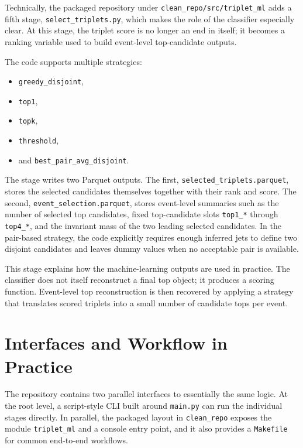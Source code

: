 \documentclass[11pt]{article}
\begin{document}
Technically, the packaged repository under \texttt{clean\_repo/src/triplet\_ml} adds a fifth stage, \texttt{select\_triplets.py}, which makes the role of the classifier especially clear. At this stage, the triplet score is no longer an end in itself; it becomes a ranking variable used to build event-level top-candidate outputs.

The code supports multiple strategies:
\begin{itemize}[leftmargin=*]
  \item \texttt{greedy\_disjoint},
  \item \texttt{top1},
  \item \texttt{topk},
  \item \texttt{threshold},
  \item and \texttt{best\_pair\_avg\_disjoint}.
\end{itemize}

The stage writes two Parquet outputs. The first, \texttt{selected\_triplets.parquet}, stores the selected candidates themselves together with their rank and score. The second, \texttt{event\_selection.parquet}, stores event-level summaries such as the number of selected top candidates, fixed top-candidate slots \texttt{top1\_*} through \texttt{top4\_*}, and the invariant mass of the two leading selected candidates. In the pair-based strategy, the code explicitly requires enough inferred jets to define two disjoint candidates and leaves dummy values when no acceptable pair is available.

This stage explains how the machine-learning outputs are used in practice. The classifier does not itself reconstruct a final top object; it produces a scoring function. Event-level top reconstruction is then recovered by applying a strategy that translates scored triplets into a small number of candidate tops per event.

\section{Interfaces and Workflow in Practice}

The repository contains two parallel interfaces to essentially the same logic. At the root level, a script-style CLI built around \texttt{main.py} can run the individual stages directly. In parallel, the packaged layout in \texttt{clean\_repo} exposes the module \texttt{triplet\_ml} and a console entry point, and it also provides a \texttt{Makefile} for common end-to-end workflows.
\end{document}
